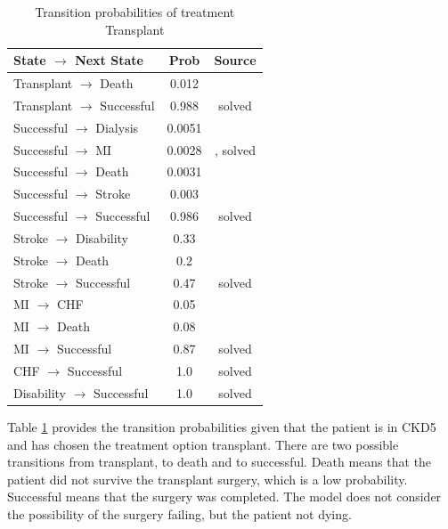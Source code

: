 \documentclass[10pt,twocolumn]{article}
\begin{document}
\begin{table}[ht]
  \centering
  \caption{Transition probabilities of treatment Transplant}
  \label{tab:trans2}
  \begin{tabularx}{\columnwidth}{X c c} 
      \toprule
 State \(\rightarrow\) Next State & Prob & Source \\ 
      \midrule
 Transplant \(\rightarrow\) Death & 0.012 & \cite{ckdmodel} \\
 Transplant \(\rightarrow\) Successful & 0.988 & solved \\
      
 Successful \(\rightarrow\) Dialysis & 0.0051 & \cite{ckdmodel} \\
 Successful \(\rightarrow\) MI & 0.0028 & \cite{ckdmodel}, solved \\
 Successful \(\rightarrow\) Death & 0.0031 & \cite{ckdmodel} \\
 Successful \(\rightarrow\) Stroke & 0.003 & \cite{ckdmodel} \\
 Successful \(\rightarrow\) Successful & 0.986 & solved \\
      
 Stroke \(\rightarrow\) Disability & 0.33 & \cite{ckdmodel} \\
 Stroke \(\rightarrow\) Death & 0.2 & \cite{ckdmodel} \\
 Stroke \(\rightarrow\) Successful & 0.47 & solved \\
      
 MI \(\rightarrow\) CHF & 0.05 & \cite{ckdmodel} \\
 MI \(\rightarrow\) Death & 0.08 & \cite{ckdmodel} \\
 MI \(\rightarrow\) Successful & 0.87 & solved \\
      
 CHF \(\rightarrow\) Successful & 1.0 & solved \\
 Disability \(\rightarrow\) Successful & 1.0 & solved \\  
      \bottomrule
  \end{tabularx}
\end{table}

Table \ref{tab:trans2} provides the transition probabilities given that the patient is in CKD5 and has chosen the treatment option transplant. There are two possible transitions from transplant, to death and to successful. Death means that the patient did not survive the transplant surgery, which is a low probability. Successful means that the surgery was completed. The model does not consider the possibility of the surgery failing, but the patient not dying.
\end{document}
